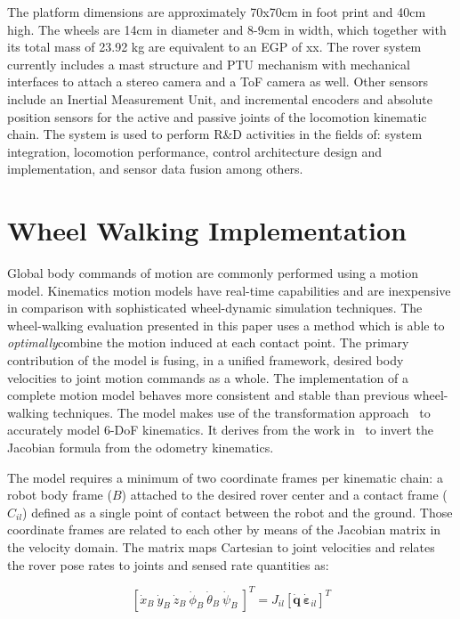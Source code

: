 \documentclass[a4paper,twocolumn]{esapub2005} %
\begin{document}
The platform dimensions are approximately 70x70cm in foot print and 40cm high. The wheels are 14cm in diameter and 8-9cm in width, which together with its total mass of 23.92 kg are equivalent to an EGP of xx.
The rover system currently includes a mast structure and PTU mechanism with mechanical interfaces to attach a stereo camera and a ToF camera as well. Other sensors include an Inertial Measurement Unit, and incremental encoders and absolute position sensors for the active and passive joints of the locomotion kinematic chain.
The system is used to perform R\&D activities in the fields of: system integration, locomotion performance, control architecture design and implementation, and sensor data fusion among others. 



\section{Wheel Walking Implementation}

Global body commands of motion are commonly performed using a motion model.
Kinematics motion models have real-time capabilities and are inexpensive in
comparison with sophisticated wheel-dynamic simulation techniques.  The
wheel-walking evaluation presented in this paper uses a method which is able to
\textit{optimally}\footnotemark[2] combine the motion induced at each contact
point. The primary contribution of the model is fusing, in a unified framework,
desired body velocities to joint motion commands as a whole.  The
implementation of a complete motion model behaves more consistent and stable
than previous wheel-walking techniques. The model makes use of the
transformation approach~\cite{Tarokh2005} to accurately model 6-DoF kinematics.
It derives from the work in~\cite{Hidalgo-Carrio2014} to invert the Jacobian
formula from the odometry kinematics.

The model requires a minimum of two coordinate frames per kinematic chain:
a robot body frame ($B$) attached to the desired rover center and a
contact frame ($C_{il}$) defined as a single point of contact between the robot
and the ground. Those coordinate frames are related to each other by means of
the Jacobian matrix in the velocity domain. The matrix maps Cartesian to joint velocities and
relates the rover pose rates to joints and sensed rate quantities as:

\begin{equation}
    \left[\dot{x}_{B} ~ \dot{y}_{B} ~ \dot{z}_{B} ~ \dot{\phi}_{B} ~ \dot{\theta}_{B} ~ \dot{\psi}_{B} ~ \right]^T =
    J_{il} \left[\boldsymbol{\dot{q}} ~ \boldsymbol{\dot{\varepsilon}}_{il} \right]^T
\label{eq:wheeljacobian}
\end{equation}
\end{document}
